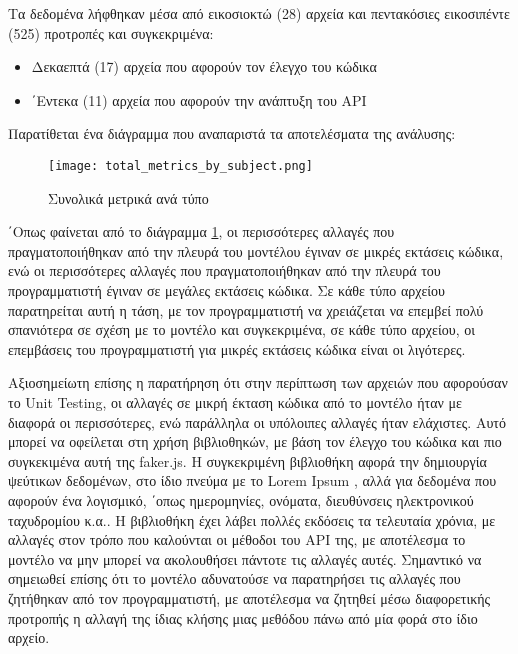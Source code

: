 Τα δεδομένα λήφθηκαν μέσα από εικοσιοκτώ (28) αρχεία και πεντακόσιες
εικοσιπέντε (525) προτροπές και συγκεκριμένα:
\begin{itemize}
  \item
    Δεκαεπτά (17) αρχεία που αφορούν τον έλεγχο του κώδικα
  \item
    ΄Εντεκα (11) αρχεία που αφορούν την ανάπτυξη του \textlatin{API}
\end{itemize}

Παρατίθεται ένα διάγραμμα που αναπαριστά τα αποτελέσματα της ανάλυσης:

\begin{figure}[htbp]
  \centering
  \texttt{[image: total\_metrics\_by\_subject.png]}
  \caption{Συνολικά μετρικά ανά τύπο}
  \label{fig:totalMetrics}
\end{figure}

΄Οπως φαίνεται από το διάγραμμα \ref{fig:totalMetrics}, οι περισσότερες
αλλαγές που πραγματοποιήθηκαν από την πλευρά του μοντέλου έγιναν σε
μικρές εκτάσεις κώδικα, ενώ οι περισσότερες αλλαγές που
πραγματοποιήθηκαν από την πλευρά του προγραμματιστή έγιναν σε μεγάλες
εκτάσεις κώδικα. Σε κάθε τύπο αρχείου παρατηρείται αυτή η τάση, με τον
προγραμματιστή να χρειάζεται να επεμβεί πολύ σπανιότερα σε σχέση με το
μοντέλο και συγκεκριμένα, σε κάθε τύπο αρχείου, οι επεμβάσεις του
προγραμματιστή για μικρές εκτάσεις κώδικα είναι οι λιγότερες.

Αξιοσημείωτη επίσης η παρατήρηση ότι στην περίπτωση των αρχειών που
αφορούσαν το \textlatin{Unit Testing}, οι αλλαγές σε μικρή έκταση κώδικα
από το μοντέλο ήταν με διαφορά οι περισσότερες, ενώ παράλληλα οι
υπόλοιπες αλλαγές ήταν ελάχιστες. Αυτό μπορεί να οφείλεται στη χρήση
βιβλιοθηκών, με βάση τον έλεγχο του κώδικα και πιο συγκεκιμένα αυτή της
\textlatin{faker.js}\cite{fakerjs}. Η συγκεκριμένη βιβλιοθήκη αφορά την
δημιουργία ψεύτικων δεδομένων, στο ίδιο πνεύμα με το \textlatin{Lorem
Ipsum} \cite{lipsum}, αλλά για δεδομένα που αφορούν ένα λογισμικό,
΄οπως ημερομηνίες, ονόματα, διευθύνσεις ηλεκτρονικού ταχυδρομίου κ.α.. Η
βιβλιοθήκη έχει λάβει πολλές εκδόσεις τα τελευταία χρόνια, με αλλαγές
στον τρόπο που καλούνται οι μέθοδοι του \textlatin{API} της, με
αποτέλεσμα το μοντέλο να μην μπορεί να ακολουθήσει πάντοτε τις αλλαγές
αυτές. Σημαντικό να σημειωθεί επίσης ότι το μοντέλο αδυνατούσε να
παρατηρήσει τις αλλαγές που ζητήθηκαν από τον προγραμματιστή, με
αποτέλεσμα να ζητηθεί μέσω διαφορετικής προτροπής η αλλαγή της ίδιας
κλήσης μιας μεθόδου πάνω από μία φορά στο ίδιο αρχείο.

